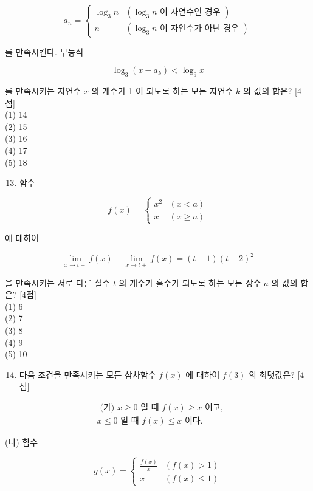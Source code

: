 \documentclass[10pt]{article}
\begin{document}
\[
a_{n}= \begin{cases}\log _{3} n & \left(\log _{3} n \text { 이 자연수인 경우 }\right) \\ n & \left(\log _{3} n \text { 이 자연수가 아닌 경우 }\right)\end{cases}
\]

를 만족시킨다. 부등식

\[
\log _{3}\left(x-a_{k}\right)<\log _{9} x
\]

를 만족시키는 자연수 \(x\) 의 개수가 1 이 되도록 하는 모든 자연수 \(k\) 의 값의 합은? [4점]\\
(1) 14\\
(2) 15\\
(3) 16\\
(4) 17\\
(5) 18

\begin{enumerate}
  \setcounter{enumi}{12}
  \item 함수
\end{enumerate}

\[
f(x)= \begin{cases}x^{2} & (x<a) \\ x & (x \geq a)\end{cases}
\]

에 대하여

\[
\lim _{x \rightarrow t-} f(x)-\lim _{x \rightarrow t+} f(x)=(t-1)(t-2)^{2}
\]

을 만족시키는 서로 다른 실수 \(t\) 의 개수가 홀수가 되도록 하는 모든 상수 \(a\) 의 값의 합은? [4점]\\
(1) 6\\
(2) 7\\
(3) 8\\
(4) 9\\
(5) 10

\begin{enumerate}
  \setcounter{enumi}{13}
  \item 다음 조건을 만족시키는 모든 삼차함수 \(f(x)\) 에 대하여 \(f(3)\) 의 최댓값은? [4점]
\end{enumerate}

\[
\begin{aligned}
& \text { (가) } x \geq 0 \text { 일 때 } f(x) \geq x \text { 이고, } \\
& x \leq 0 \text { 일 때 } f(x) \leq x \text { 이다. }
\end{aligned}
\]

(나) 함수

\[
g(x)= \begin{cases}\frac{f(x)}{x} & (f(x)>1) \\ x & (f(x) \leq 1)\end{cases}
\]
\end{document}

